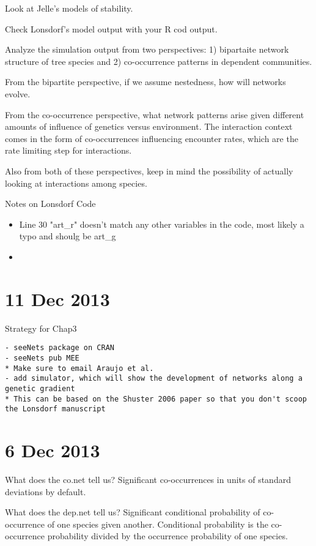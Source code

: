 \documentclass[12pt]{article}
\begin{document}
Look at Jelle's models of stability.

Check Lonsdorf's model output with your R cod output.

Analyze the simulation output from two perspectives: 1) bipartaite
network structure of tree species and 2) co-occurrence patterns in
dependent communities. 

From the bipartite perspective, if we assume nestedness, how will
networks evolve.

From the co-occurrence perspective, what network patterns arise given
different amounts of influence of genetics versus environment. The
interaction context comes in the form of co-occurrences influencing
encounter rates, which are the rate limiting step for interactions.

Also from both of these perspectives, keep in mind the possibility of
actually looking at interactions among species. 

Notes on Lonsdorf Code
\begin{itemize}
\item Line 30 "art_r" doesn't match any other variables in the code,
  most likely a typo and shoulg be art_g
\item 
\end{itemize}


\section{11 Dec 2013}

Strategy for Chap3
\begin{verbatim}
- seeNets package on CRAN
- seeNets pub MEE
* Make sure to email Araujo et al.
- add simulator, which will show the development of networks along a
genetic gradient
* This can be based on the Shuster 2006 paper so that you don't scoop
the Lonsdorf manuscript
\end{verbatim}

\section{6 Dec 2013}

What does the co.net tell us?
Significant co-occurrences in units of standard deviations by default.

What does the dep.net tell us?
Significant conditional probability of co-occurrence of one species
given another. Conditional probability is the co-occurrence
probability divided by the occurrence probability of one species.
\end{document}
